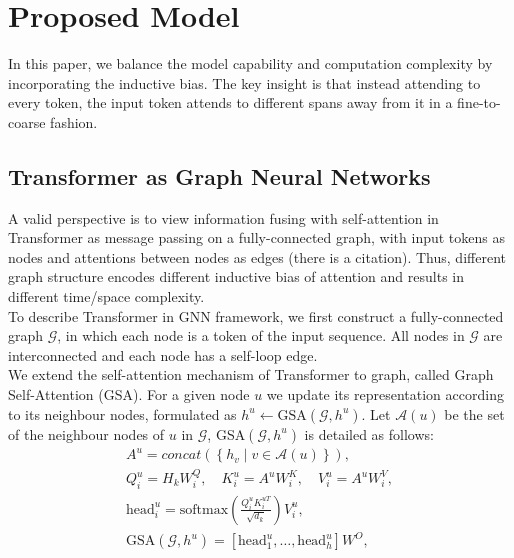 \section{Proposed Model}

In this paper, we balance the model capability and computation complexity by
incorporating the inductive bias. The key insight is that instead attending to
every token, the input token attends to different spans away from it in a
fine-to-coarse fashion.


\subsection{Transformer as Graph Neural Networks}

A valid perspective is to view information fusing with self-attention in
Transformer as message passing on a fully-connected graph, with input tokens as
nodes and attentions between nodes as edges (there is a citation).
Thus, different graph structure encodes different inductive bias of attention
and results in different time/space complexity.\\
To describe Transformer in GNN framework, we first construct a fully-connected
graph $\mathcal{G}$, in which each node is a token of the input sequence. All
nodes in $\mathcal{G}$ are interconnected and each node has a self-loop edge.\\
We extend the self-attention mechanism of Transformer to graph, called Graph
Self-Attention (GSA). For a given node $u$ we update its representation
according to its neighbour nodes, formulated as $h^u \leftarrow
\text{GSA}(\mathcal{G}, h^u)$. Let $\mathcal{A}(u)$ be the set of the neighbour
nodes of $u$ in $\mathcal{G}$, GSA$(\mathcal{G}, h^u)$ is detailed as follows:
\begin{align}
    A^u = concat \left( \left\{ h_v \mid v \in \mathcal{A}(u) \right\}
    \right),\\
    Q_i^u = H_k W_i^Q, \quad K_i^u = A^u W_i^K, \quad V_i^u = A^u W_i^V,\\
    \text{head}_i^u = \text{softmax} \left( \frac{Q_i^u K_i^{uT}}{\sqrt{d_k}}
    \right) V_i^u,
    \label{eq:head}
    \\
    \text{GSA}(\mathcal{G}, h^u) = [\text{head}_1^u, \dots, \text{head}_h^u]
    W^O,
\end{align}

